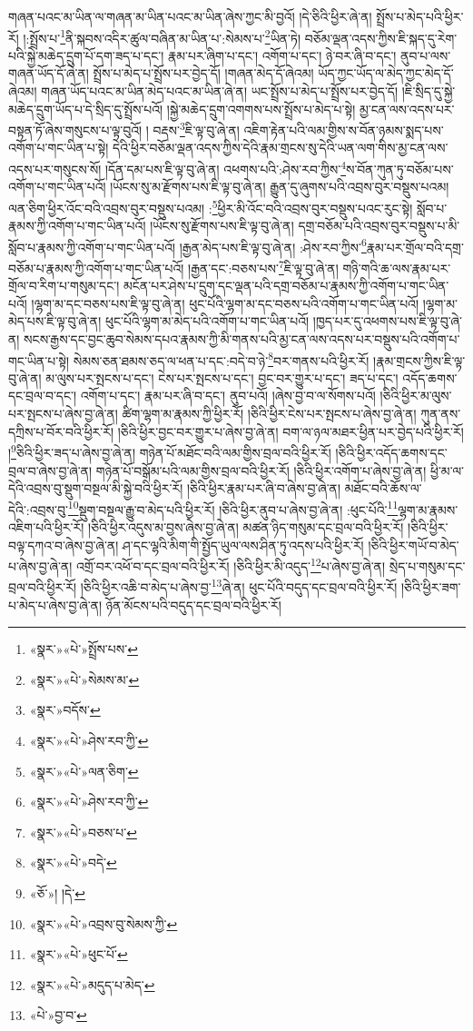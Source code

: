 གཞན་པའང་མ་ཡིན་ལ་གཞན་མ་ཡིན་པའང་མ་ཡིན་ཞེས་ཀྱང་མི་བྱའོ། །དེ་ཅིའི་ཕྱིར་ཞེ་ན། སྤྲོས་པ་མེད་པའི་ཕྱིར་རོ། །:སྤྲོས་པ་\footnote{«སྣར་»«པེ་»སྤྲོས་པས་}ནི་སྐབས་འདིར་ཚུལ་བཞིན་མ་ཡིན་པ་:སེམས་པ་\footnote{«སྣར་»«པེ་»སེམས་མ་}ཡིན་ཏེ། བཅོམ་ལྡན་འདས་ཀྱིས་ཇི་སྐད་དུ་རེག་པའི་སྐྱེ་མཆེད་དྲུག་པོ་དག་ཟད་པ་དང་། རྣམ་པར་ཞིག་པ་དང་། འགོག་པ་དང་། ཉེ་བར་ཞི་བ་དང་། ནུབ་པ་ལས་གཞན་ཡོད་དོ་ཞེ་ན། སྤྲོས་པ་མེད་པ་སྤྲོས་པར་བྱེད་དོ། །གཞན་མེད་དོ་ཞེའམ། ཡོད་ཀྱང་ཡོད་ལ་མེད་ཀྱང་མེད་དོ་ཞེའམ། གཞན་ཡོད་པའང་མ་ཡིན་མེད་པའང་མ་ཡིན་ཞེ་ན། ཡང་སྤྲོས་པ་མེད་པ་སྤྲོས་པར་བྱེད་དོ། །ཇི་སྲིད་དུ་སྐྱེ་མཆེད་དྲུག་ཡོད་པ་དེ་སྲིད་དུ་སྤྲོས་པའོ། །སྐྱེ་མཆེད་དྲུག་འགགས་པས་སྤྲོས་པ་མེད་པ་སྟེ། མྱ་ངན་ལས་འདས་པར་བསྟན་ཏོ་ཞེས་གསུངས་པ་ལྟ་བུའོ། །
བརྡས་\footnote{«སྣར་»བདོས་}ཇི་ལྟ་བུ་ཞེ་ན། འཇིག་རྟེན་པའི་ལམ་གྱིས་ས་བོན་ཉམས་སྨད་པས་འགོག་པ་གང་ཡིན་པ་སྟེ། དེའི་ཕྱིར་བཅོམ་ལྡན་འདས་ཀྱིས་དེའི་རྣམ་གྲངས་སུ་དེའི་ཡན་ལག་གིས་མྱ་ངན་ལས་འདས་པར་གསུངས་སོ། །དོན་དམ་པས་ཇི་ལྟ་བུ་ཞེ་ན། འཕགས་པའི་:ཤེས་རབ་ཀྱིས་\footnote{«སྣར་»«པེ་»ཤེས་རབ་ཀྱི་}ས་བོན་ཀུན་ཏུ་བཅོམ་པས་འགོག་པ་གང་ཡིན་པའོ། །ཡོངས་སུ་མ་རྫོགས་པས་ཇི་ལྟ་བུ་ཞེ་ན། རྒྱུན་དུ་ཞུགས་པའི་འབྲས་བུར་བསྡུས་པའམ། ལན་ཅིག་ཕྱིར་འོང་བའི་འབྲས་བུར་བསྡུས་པའམ། :\footnote{«སྣར་»«པེ་»ལན་ཅིག་}ཕྱིར་མི་འོང་བའི་འབྲས་བུར་བསྡུས་པའང་རུང་སྟེ། སློབ་པ་རྣམས་ཀྱི་འགོག་པ་གང་ཡིན་པའོ། །ཡོངས་སུ་རྫོགས་པས་ཇི་ལྟ་བུ་ཞེ་ན། དགྲ་བཅོམ་པའི་འབྲས་བུར་བསྡུས་པ་མི་སློབ་པ་རྣམས་ཀྱི་འགོག་པ་གང་ཡིན་པའོ། །རྒྱན་མེད་པས་ཇི་ལྟ་བུ་ཞེ་ན། :ཤེས་རབ་ཀྱིས་\footnote{«སྣར་»«པེ་»ཤེས་རབ་ཀྱི་}རྣམ་པར་གྲོལ་བའི་དགྲ་བཅོམ་པ་རྣམས་ཀྱི་འགོག་པ་གང་ཡིན་པའོ། །རྒྱན་དང་:བཅས་པས་\footnote{«སྣར་»«པེ་»བཅས་པ་}ཇི་ལྟ་བུ་ཞེ་ན། གཉི་གའི་ཆ་ལས་རྣམ་པར་གྲོལ་བ་རིག་པ་གསུམ་དང་། མངོན་པར་ཤེས་པ་དྲུག་དང་ལྡན་པའི་དགྲ་བཅོམ་པ་རྣམས་ཀྱི་འགོག་པ་གང་ཡིན་པའོ། །ལྷག་མ་དང་བཅས་པས་ཇི་ལྟ་བུ་ཞེ་ན། ཕུང་པོའི་ལྷག་མ་དང་བཅས་པའི་འགོག་པ་གང་ཡིན་པའོ། །ལྷག་མ་མེད་པས་ཇི་ལྟ་བུ་ཞེ་ན། ཕུང་པོའི་ལྷག་མ་མེད་པའི་འགོག་པ་གང་ཡིན་པའོ། །ཁྱད་པར་དུ་འཕགས་པས་ཇི་ལྟ་བུ་ཞེ་ན། སངས་རྒྱས་དང་བྱང་ཆུབ་སེམས་དཔའ་རྣམས་ཀྱི་མི་གནས་པའི་མྱ་ངན་ལས་འདས་པར་བསྡུས་པའི་འགོག་པ་གང་ཡིན་པ་སྟེ། སེམས་ཅན་ཐམས་ཅད་ལ་ཕན་པ་དང་:བདེ་བ་ཉེ་\footnote{«སྣར་»«པེ་»བདེ་}བར་གནས་པའི་ཕྱིར་རོ། །རྣམ་གྲངས་ཀྱིས་ཇི་ལྟ་བུ་ཞེ་ན། མ་ལུས་པར་སྤངས་པ་དང་། ངེས་པར་སྤངས་པ་དང་། བྱང་བར་གྱུར་པ་དང་། ཟད་པ་དང་། འདོད་ཆགས་དང་བྲལ་བ་དང་། འགོག་པ་དང་། རྣམ་པར་ཞི་བ་དང་། ནུབ་པའོ། །ཞེས་བྱ་བ་ལ་སོགས་པའོ། །ཅིའི་ཕྱིར་མ་ལུས་པར་སྤངས་པ་ཞེས་བྱ་ཞེ་ན། ཚིག་ལྷག་མ་རྣམས་ཀྱི་ཕྱིར་རོ། །ཅིའི་ཕྱིར་ངེས་པར་སྤངས་པ་ཞེས་བྱ་ཞེ་ན། ཀུན་ནས་དཀྲིས་པ་བོར་བའི་ཕྱིར་རོ། །ཅིའི་ཕྱིར་བྱང་བར་གྱུར་པ་ཞེས་བྱ་ཞེ་ན། བག་ལ་ཉལ་མཐར་ཕྱིན་པར་བྱེད་པའི་ཕྱིར་རོ། །\footnote{«ཅོ་»། །དེ་}ཅིའི་ཕྱིར་ཟད་པ་ཞེས་བྱ་ཞེ་ན། གཉེན་པོ་མཐོང་བའི་ལམ་གྱིས་བྲལ་བའི་ཕྱིར་རོ། །ཅིའི་ཕྱིར་འདོད་ཆགས་དང་བྲལ་བ་ཞེས་བྱ་ཞེ་ན། གཉེན་པོ་བསྒོམ་པའི་ལམ་གྱིས་བྲལ་བའི་ཕྱིར་རོ། །ཅིའི་ཕྱིར་འགོག་པ་ཞེས་བྱ་ཞེ་ན། ཕྱི་མ་ལ་དེའི་འབྲས་བུ་སྡུག་བསྔལ་མི་སྐྱེ་བའི་ཕྱིར་རོ། །ཅིའི་ཕྱིར་རྣམ་པར་ཞི་བ་ཞེས་བྱ་ཞེ་ན། མཐོང་བའི་ཆོས་ལ་དེའི་:འབྲས་བུ་\footnote{«སྣར་»«པེ་»འབྲས་བུ་སེམས་ཀྱི་}སྡུག་བསྔལ་རྒྱུ་བ་མེད་པའི་ཕྱིར་རོ། །ཅིའི་ཕྱིར་ནུབ་པ་ཞེས་བྱ་ཞེ་ན། :ཕུང་པོའི་\footnote{«སྣར་»«པེ་»ཕུང་པོ་}ལྷག་མ་རྣམས་འཇིག་པའི་ཕྱིར་རོ། །ཅིའི་ཕྱིར་འདུས་མ་བྱས་ཞེས་བྱ་ཞེ་ན། མཚན་ཉིད་གསུམ་དང་བྲལ་བའི་ཕྱིར་རོ། །ཅིའི་ཕྱིར་བལྟ་དཀའ་བ་ཞེས་བྱ་ཞེ་ན། ཤ་དང་ལྷའི་མིག་གི་སྤྱོད་ཡུལ་ལས་ཤིན་ཏུ་འདས་པའི་ཕྱིར་རོ། །ཅིའི་ཕྱིར་གཡོ་བ་མེད་པ་ཞེས་བྱ་ཞེ་ན། འགྲོ་བར་འཕོ་བ་དང་བྲལ་བའི་ཕྱིར་རོ། །ཅིའི་ཕྱིར་མི་འདུད་\footnote{«སྣར་»«པེ་»མདུད་པ་མེད་}པ་ཞེས་བྱ་ཞེ་ན། སྲེད་པ་གསུམ་དང་བྲལ་བའི་ཕྱིར་རོ། །ཅིའི་ཕྱིར་འཆི་བ་མེད་པ་ཞེས་བྱ་\footnote{«པེ་»བྱ་བ་}ཞེ་ན། ཕུང་པོའི་བདུད་དང་བྲལ་བའི་ཕྱིར་རོ། །ཅིའི་ཕྱིར་ཟག་པ་མེད་པ་ཞེས་བྱ་ཞེ་ན། ཉོན་མོངས་པའི་བདུད་དང་བྲལ་བའི་ཕྱིར་རོ། 